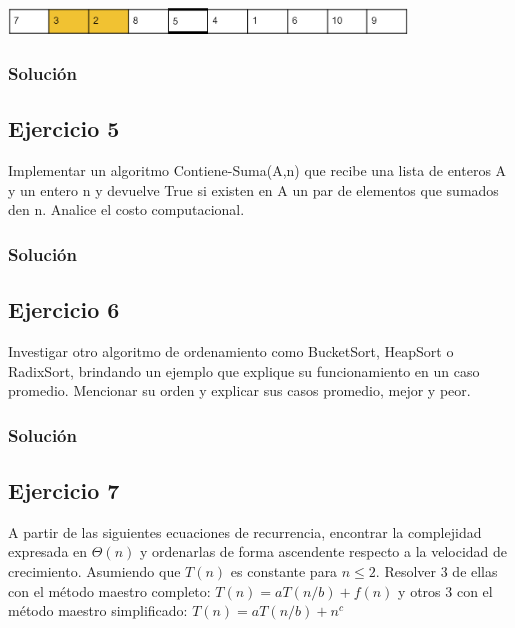 \documentclass{article}
\begin{document}
\includegraphics[width=400px]{./img/ejemploEjercicio4.png}

\subsubsection*{Solución}


\subsection*{Ejercicio 5}
Implementar un algoritmo Contiene-Suma(A,n) que recibe una lista de enteros A y un entero n y devuelve True si existen en A un par de elementos que sumados den n. Analice el costo computacional.

\subsubsection*{Solución}


\subsection*{Ejercicio 6}
Investigar otro algoritmo de ordenamiento como BucketSort, HeapSort o RadixSort, brindando un ejemplo que explique su funcionamiento en un caso promedio. Mencionar su orden y explicar sus casos promedio, mejor y peor.

\subsubsection*{Solución}


\subsection*{Ejercicio 7}
A partir de las siguientes ecuaciones de recurrencia, encontrar la complejidad expresada en $\Theta (n)$ y ordenarlas de forma ascendente respecto a la velocidad de crecimiento. Asumiendo que $T(n)$ es constante para $n \leq 2$. Resolver 3 de ellas con el método maestro completo: $T(n) = a T(n/b) + f(n)$ y otros 3 con el método maestro simplificado: $T(n) = a T(n/b) + n^c$
\end{document}
